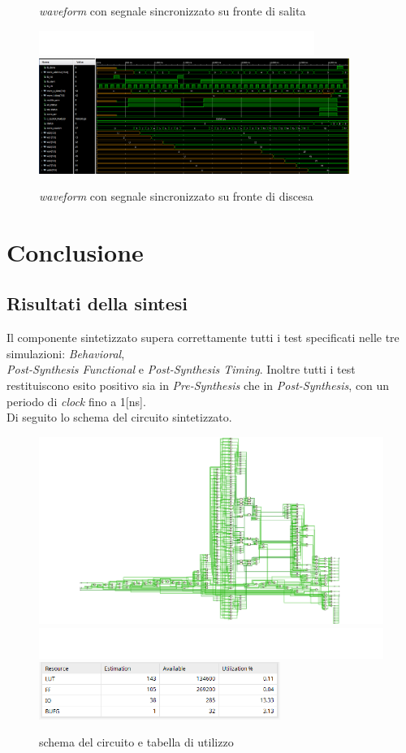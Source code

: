 \documentclass{article}
\begin{document}
\begin{enumerate}
\begin{figure}[h]
    \caption{\textit{waveform} con segnale sincronizzato su fronte di salita}
    \includegraphics[width=0.8\textwidth]{spazio}
    \includegraphics[width=0.9\textwidth]{rst_while_start_f0}
    \caption{\textit{waveform} con segnale sincronizzato su fronte di discesa}
\end{figure}
\end{enumerate}
\pagebreak
\section{Conclusione}
\subsection{Risultati della sintesi}
Il componente sintetizzato supera correttamente tutti i test specificati nelle tre simulazioni: \textit{Behavioral}, \\\textit{Post-Synthesis Functional} e \textit{Post-Synthesis Timing}. Inoltre tutti i test restituiscono esito positivo sia in \textit{Pre-Synthesis} che in \textit{Post-Synthesis}, con un periodo di \textit{clock} fino a 1[ns].\\ Di seguito lo schema del circuito sintetizzato.
\begin{figure}[h]
    \centering
    \includegraphics[width=1\textwidth]{schema}
    \includegraphics[width=1\textwidth]{spazio}
    \includegraphics[width=0.7\textwidth]{utilizzo}
    \caption{schema del circuito e tabella di utilizzo}
\end{figure}
\end{document}

